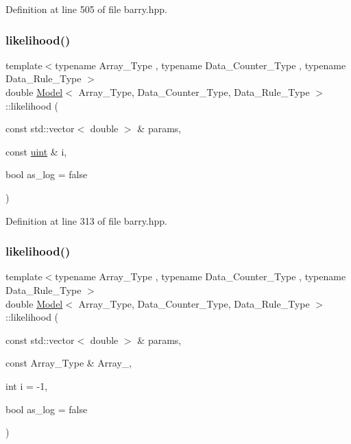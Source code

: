Definition at line 505 of file barry.\+hpp.

\mbox{\label{classbarry_1_1_model_ae75fe2213980b6b245e279c7836ab99b}} 
\subsubsection{\texorpdfstring{likelihood()}{likelihood()}\hspace{0.1cm}{\footnotesize\ttfamily [1/3]}}
{\footnotesize\ttfamily template$<$typename Array\+\_\+\+Type , typename Data\+\_\+\+Counter\+\_\+\+Type , typename Data\+\_\+\+Rule\+\_\+\+Type $>$ \\
double \hyperlink{classbarry_1_1_model}{Model}$<$ Array\+\_\+\+Type, Data\+\_\+\+Counter\+\_\+\+Type, Data\+\_\+\+Rule\+\_\+\+Type $>$\+::likelihood (\begin{DoxyParamCaption}\item[{const std\+::vector$<$ double $>$ \&}]{params,  }\item[{const \hyperlink{namespacebarry_a11dfc53ddb4672278319aa04f1e09a6c}{uint} \&}]{i,  }\item[{bool}]{as\+\_\+log = {\ttfamily false} }\end{DoxyParamCaption})\hspace{0.3cm}{\ttfamily [inline]}}



Definition at line 313 of file barry.\+hpp.

\mbox{\label{classbarry_1_1_model_a147586ed14d850ebab2615c60aa29b80}} 
\subsubsection{\texorpdfstring{likelihood()}{likelihood()}\hspace{0.1cm}{\footnotesize\ttfamily [2/3]}}
{\footnotesize\ttfamily template$<$typename Array\+\_\+\+Type , typename Data\+\_\+\+Counter\+\_\+\+Type , typename Data\+\_\+\+Rule\+\_\+\+Type $>$ \\
double \hyperlink{classbarry_1_1_model}{Model}$<$ Array\+\_\+\+Type, Data\+\_\+\+Counter\+\_\+\+Type, Data\+\_\+\+Rule\+\_\+\+Type $>$\+::likelihood (\begin{DoxyParamCaption}\item[{const std\+::vector$<$ double $>$ \&}]{params,  }\item[{const Array\+\_\+\+Type \&}]{Array\+\_\+,  }\item[{int}]{i = {\ttfamily -\/1},  }\item[{bool}]{as\+\_\+log = {\ttfamily false} }\end{DoxyParamCaption})\hspace{0.3cm}{\ttfamily [inline]}}



